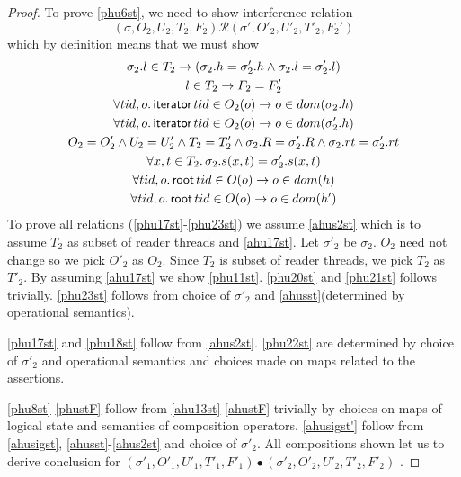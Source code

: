 \begin{proof}
To prove \ref{phu6st}, we need to show interference relation
\[(\sigma, O_2, U_2, T_2,F_2) \mathcal{R} (\sigma', O'_2, U'_2, T'_2,F_2')  \]
which by definition means that we must show 
\begin{gather}\label{phu17st}
  \sigma_2.l  \in  T_2 \rightarrow (\sigma_2.h =\sigma'_2.h \land \sigma_2.l=\sigma'_2.l)\\
  \label{phu18st}
  l\in T_2\rightarrow F_2=F_2'\\
  \label{phu20st}
  \forall tid,o\ldotp\textsf{iterator} \, tid \in O_2(o) \rightarrow o \in dom(\sigma_2.h) \\
  \label{phu21st}
  \forall tid,o\ldotp\textsf{iterator} \, tid \in O_2(o) \rightarrow o \in dom(\sigma'_2.h) \\
  \label{phu22st}
  O_2 = O_2' \land U_2 = U_2' \land T_2 = T_2'\land \sigma_2.R = \sigma'_2.R \land \sigma_2.rt = \sigma'_2.rt \\
  \label{phu23st}
  \forall x, t \in T_2 \ldotp \sigma_2.s(x,t) = \sigma'_2.s(x,t)\\
    \label{phustrt1}
  \forall tid,o\ldotp\textsf{root} \, tid \in O(o) \rightarrow o \in dom(h) \\
  \label{phustrt2}
  \forall tid,o\ldotp\textsf{root} \, tid \in O(o) \rightarrow o \in dom(h') 
\end{gather}
To prove all relations (\ref{phu17st}-\ref{phu23st}) we assume \ref{ahus2st} which is to assume $T_2$ as subset of reader threads and \ref{ahu17st}. Let $\sigma'_2$ be $\sigma_2$. $O_2$ need not change so we pick $O'_2$  as $O_2$. Since $T_2$ is subset of reader threads, we pick $T_2$ as  $T'_2$. By assuming \ref{ahu17st} we show \ref{phu11st}. \ref{phu20st} and \ref{phu21st} follows trivially. \ref{phu23st} follows from choice of $\sigma'_2$ and \ref{ahusst}(determined by operational semantics). 

\ref{phu17st} and \ref{phu18st} follow from \ref{ahus2st}. \ref{phu22st} are determined by choice of $\sigma'_2$ and operational semantics and choices made on maps related to the assertions.

\ref{phu8st}-\ref{phustF} follow from \ref{ahu13st}-\ref{ahustF} trivially by choices on maps of logical state and semantics of composition operators. \ref{ahusigst'} follow from \ref{ahusigst}, \ref{ahusst}-\ref{ahus2st} and choice of $\sigma'_2$. All compositions shown let us to derive conclusion for $(\sigma'_1, O'_1, U'_1, T'_1,F'_1) \bullet (\sigma'_2, O'_2, U'_2, T'_2,F'_2) $ .
 \end{proof}
 
